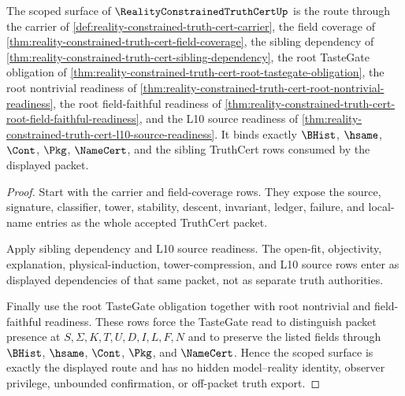 \begin{theorem}
\label{thm:reality-constrained-truth-cert-scoped-tastegate-route}
The scoped surface of $\RealityConstrainedTruthCertUp$ is the route through the carrier of \autoref{def:reality-constrained-truth-cert-carrier}, the field coverage of \autoref{thm:reality-constrained-truth-cert-field-coverage}, the sibling dependency of \autoref{thm:reality-constrained-truth-cert-sibling-dependency}, the root TasteGate obligation of \autoref{thm:reality-constrained-truth-cert-root-tastegate-obligation}, the root nontrivial readiness of \autoref{thm:reality-constrained-truth-cert-root-nontrivial-readiness}, the root field-faithful readiness of \autoref{thm:reality-constrained-truth-cert-root-field-faithful-readiness}, and the L10 source readiness of \autoref{thm:reality-constrained-truth-cert-l10-source-readiness}. It binds exactly $\BHist$, $\hsame$, $\Cont$, $\Pkg$, $\NameCert$, and the sibling TruthCert rows consumed by the displayed packet.
\end{theorem}
\begin{proof}
Start with the carrier and field-coverage rows. They expose the source, signature, classifier, tower, stability, descent, invariant, ledger, failure, and local-name entries as the whole accepted TruthCert packet.

Apply sibling dependency and L10 source readiness. The open-fit, objectivity, explanation, physical-induction, tower-compression, and L10 source rows enter as displayed dependencies of that same packet, not as separate truth authorities.

Finally use the root TasteGate obligation together with root nontrivial and field-faithful readiness. These rows force the TasteGate read to distinguish packet presence at $S,\Sigma,K,T,U,D,I,L,F,N$ and to preserve the listed fields through $\BHist$, $\hsame$, $\Cont$, $\Pkg$, and $\NameCert$. Hence the scoped surface is exactly the displayed route and has no hidden model--reality identity, observer privilege, unbounded confirmation, or off-packet truth export.
\end{proof}
